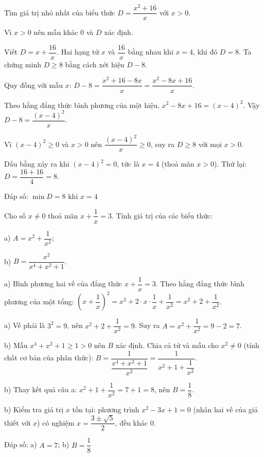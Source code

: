 \begin{problem}[8DS-PS-046]
Tìm giá trị nhỏ nhất của biểu thức $D = \dfrac{x^2 + 16}{x}$ với $x > 0$.

\begin{solution}
Vì $x > 0$ nên mẫu khác $0$ và $D$ xác định.

Viết $D = x + \dfrac{16}{x}$. Hai hạng tử $x$ và $\dfrac{16}{x}$ bằng nhau khi $x = 4$, khi đó $D = 8$. Ta chứng minh $D \geq 8$ bằng cách xét hiệu $D - 8$.

Quy đồng với mẫu $x$: $D - 8 = \dfrac{x^2 + 16 - 8x}{x} = \dfrac{x^2 - 8x + 16}{x}$.

Theo hằng đẳng thức bình phương của một hiệu, $x^2 - 8x + 16 = (x - 4)^2$. Vậy $D - 8 = \dfrac{(x - 4)^2}{x}$.

Vì $(x - 4)^2 \geq 0$ và $x > 0$ nên $\dfrac{(x - 4)^2}{x} \geq 0$, suy ra $D \geq 8$ với mọi $x > 0$.

Dấu bằng xảy ra khi $(x - 4)^2 = 0$, tức là $x = 4$ (thoả mãn $x > 0$). Thử lại: $D = \dfrac{16 + 16}{4} = 8$.

Đáp số: $\boxed{\min D = 8 \text{ khi } x = 4}$
\end{solution}
\end{problem}

\begin{problem}[8DS-PS-047]
Cho số $x \neq 0$ thoả mãn $x + \dfrac{1}{x} = 3$. Tính giá trị của các biểu thức:

a) $A = x^2 + \dfrac{1}{x^2}$;

b) $B = \dfrac{x^2}{x^4 + x^2 + 1}$.

\begin{solution}
a) Bình phương hai vế của đẳng thức $x + \dfrac{1}{x} = 3$. Theo hằng đẳng thức bình phương của một tổng: $\left(x + \dfrac{1}{x}\right)^2 = x^2 + 2 \cdot x \cdot \dfrac{1}{x} + \dfrac{1}{x^2} = x^2 + 2 + \dfrac{1}{x^2}$.

a) Vế phải là $3^2 = 9$, nên $x^2 + 2 + \dfrac{1}{x^2} = 9$. Suy ra $A = x^2 + \dfrac{1}{x^2} = 9 - 2 = 7$.

b) Mẫu $x^4 + x^2 + 1 \geq 1 > 0$ nên $B$ xác định. Chia cả tử và mẫu cho $x^2 \neq 0$ (tính chất cơ bản của phân thức): $B = \dfrac{1}{\dfrac{x^4 + x^2 + 1}{x^2}} = \dfrac{1}{x^2 + 1 + \dfrac{1}{x^2}}$.

b) Thay kết quả câu a: $x^2 + 1 + \dfrac{1}{x^2} = 7 + 1 = 8$, nên $B = \dfrac{1}{8}$.

b) Kiểm tra giá trị $x$ tồn tại: phương trình $x^2 - 3x + 1 = 0$ (nhân hai vế của giả thiết với $x$) có nghiệm $x = \dfrac{3 \pm \sqrt{5}}{2}$, đều khác $0$.

Đáp số: a) $\boxed{A = 7}$; b) $\boxed{B = \dfrac{1}{8}}$
\end{solution}
\end{problem}

